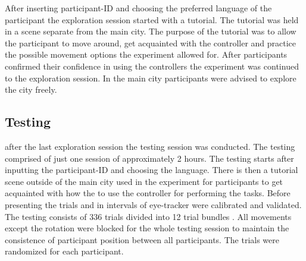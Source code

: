 After inserting participant-ID and choosing the preferred language of the participant the exploration session started with a tutorial. The tutorial was held in a scene separate from the main city. The purpose of the tutorial was to allow the participant to move around, get acquainted with the controller and practice the possible movement options the experiment allowed for. After participants confirmed their confidence in using the controllers the experiment was continued to the exploration session. In the main city participants were advised to explore the city freely.

\subsection{Testing}

 after the last exploration session the testing session was conducted. The testing comprised of just one session of approximately 2 hours. The testing starts after inputting the participant-ID and choosing the language. There is then a tutorial scene outside of the main city used in the experiment for participants to get acquainted with how the to use the controller for performing the tasks. Before presenting the trials and in intervals of  eye-tracker were calibrated and validated. \\

The testing consists of 336 trials divided into 12 trial bundles . All movements except the rotation were blocked for the whole testing session to maintain the consistence of participant position between all participants. The trials were randomized for each participant.  \\

